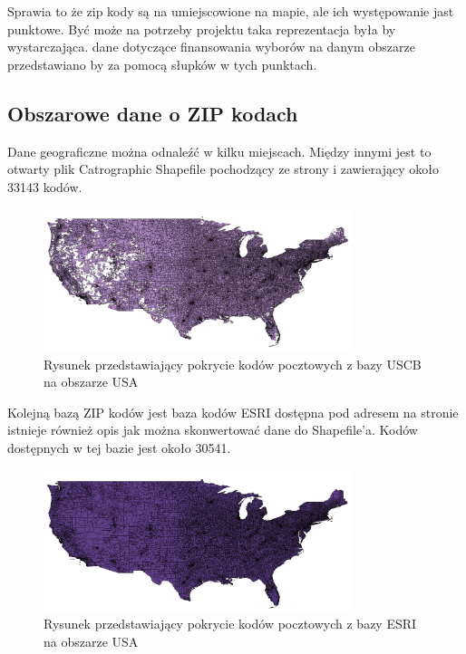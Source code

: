 \documentclass[10pt,a4paper]{article}
\begin{document}
Sprawia to że zip kody są na umiejscowione na mapie, ale ich występowanie jast punktowe.
Być może na potrzeby projektu taka reprezentacja była by wystarczająca. dane dotyczące finansowania wyborów na danym obszarze przedstawiano by za pomocą słupków w tych punktach.

\subsection{Obszarowe dane o ZIP kodach\label{sec:obszZIP}}
Dane geograficzne można odnaleźć w kilku miejscach.
Między innymi jest to otwarty plik Catrographic Shapefile pochodzący ze strony \cite[US Census Bureau]{unitedStateCensusBureauGeoMaps}
i zawierający około 33143 kodów.

\begin{figure}[H]
    \centering
    \includegraphics[width=0.8\textwidth]{bazaUSCB.png}
    \caption{Rysunek przedstawiający pokrycie kodów pocztowych z bazy USCB na obszarze USA}
    \label{fig:imageUSCB}
\end{figure}

Kolejną bazą ZIP kodów jest baza kodów ESRI dostępna pod adresem \cite[Arcgis]{arcgisDatabase} na stronie istnieje również opis jak można skonwertować dane do Shapefile'a. Kodów dostępnych w tej bazie jest około 30541. 

\begin{figure}[H]
    \centering
    \includegraphics[width=0.8\textwidth]{bazaESRI.png}
    \caption{Rysunek przedstawiający pokrycie kodów pocztowych z bazy ESRI na obszarze USA}
    \label{fig:imageESRI}
\end{figure}
 
\end{document}
